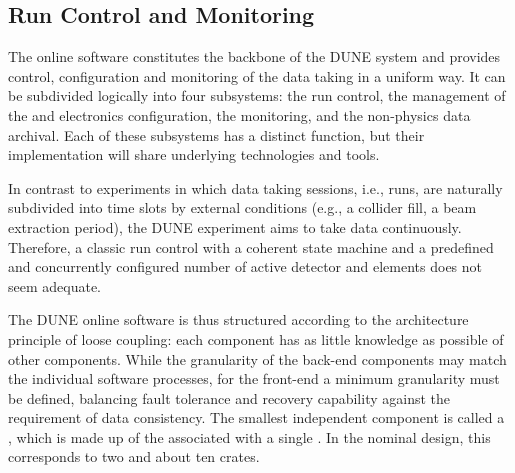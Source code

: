 
\subsection{Run Control and Monitoring}
\label{sec:fd-daq-tcm}



The online software constitutes the backbone of the DUNE 
system and provides control, configuration and monitoring of the data taking in
a uniform way.
It can be subdivided logically into four subsystems: the run control,
the management of the  and  electronics configuration, the monitoring, and the non-physics data archival.
Each of these subsystems has a distinct %
function, but their
implementation will share underlying technologies and tools.

In contrast to experiments in which data taking sessions, i.e., runs, are
naturally subdivided into time slots by external conditions (e.g., a
collider fill, a beam extraction period), the DUNE experiment aims to
take data continuously.
Therefore, a classic run control with a coherent state machine and a
predefined and concurrently configured number of active detector and
 elements does not seem adequate. 

The DUNE online software is thus structured according to the
architecture principle of loose coupling: each component has as
little knowledge as possible of other components.
While the granularity of the back-end  components may match the 
individual software processes, for the front-end  a minimum
granularity must be defined, balancing fault tolerance and
recovery capability against the requirement of data consistency.
The smallest independent component is called a , which
is made up of the  associated with a single
.
In the nominal design, this corresponds to two  
and about ten   crates.

